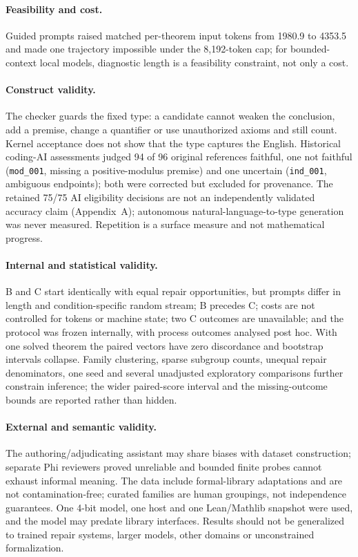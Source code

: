 \documentclass[runningheads,a4paper]{llncs}
\begin{document}
\paragraph{Feasibility and cost.} Guided prompts raised matched per-theorem input tokens from 1980.9 to 4353.5 and made one trajectory impossible under the 8,192-token cap; for bounded-context local models, diagnostic length is a feasibility constraint, not only a cost.

\paragraph{Construct validity.} The checker guards the fixed type: a candidate cannot
weaken the conclusion, add a premise, change a quantifier or use unauthorized
axioms and still count. Kernel acceptance does not show that the type captures the
English. Historical coding-AI assessments judged 94 of 96 original references
faithful, one not faithful (\texttt{mod\_001}, missing a positive-modulus premise)
and one uncertain (\texttt{ind\_001}, ambiguous endpoints); both were corrected but
excluded for provenance. The retained 75/75 AI eligibility decisions are not an
independently validated accuracy claim (Appendix~A); autonomous
natural-language-to-type generation was never measured. Repetition is a surface
measure and not mathematical progress.

\paragraph{Internal and statistical validity.} B and C start identically with equal
repair opportunities, but prompts differ in length and condition-specific random
stream; B precedes C; costs are not controlled for tokens or machine state; two C
outcomes are unavailable; and the protocol was frozen internally, with process
outcomes analysed post hoc. With one solved theorem the paired vectors have zero
discordance and bootstrap intervals collapse. Family clustering, sparse subgroup
counts, unequal repair denominators, one seed and several unadjusted exploratory
comparisons further constrain inference; the wider paired-score interval and the
missing-outcome bounds are reported rather than hidden.

\paragraph{External and semantic validity.} The authoring/adjudicating assistant may
share biases with dataset construction; separate Phi reviewers proved unreliable and
bounded finite probes cannot exhaust informal meaning. The data include
formal-library adaptations and are not contamination-free; curated families are human
groupings, not independence guarantees. One 4-bit model, one host and one
Lean/Mathlib snapshot were used, and the model may predate library interfaces.
Results should not be generalized to trained repair systems, larger models, other
domains or unconstrained formalization.
\end{document}
